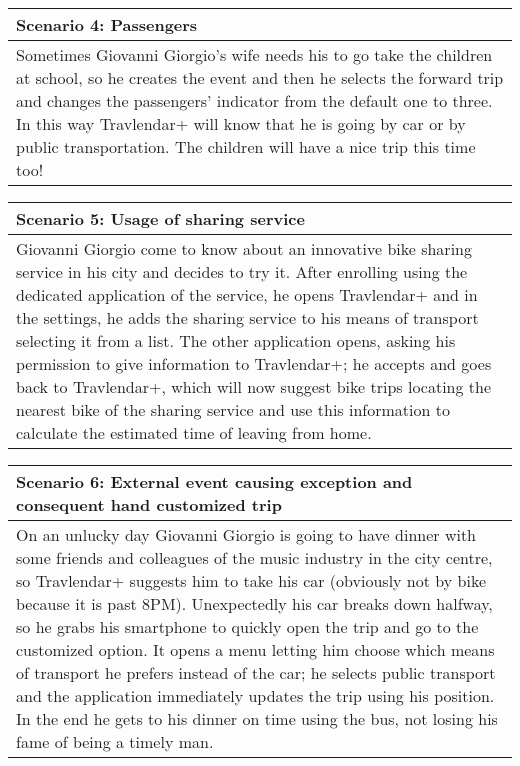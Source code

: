 \pagebreak
%
\begin{center}
\def\arraystretch{1.5}
  \begin{tabular}{ | p{} | }
    \hline
    Scenario 4: Passengers \\ \hline
    Sometimes Giovanni Giorgio's wife needs his to go take the children at school, so he creates the event and then he selects the forward trip and changes the passengers’ indicator from the default one to three. In this way Travlendar+ will know that he is going by car or by public transportation. The children will have a nice trip this time too! \\ \hline
  \end{tabular}
\end{center}
%
\begin{center}
\def\arraystretch{1.5}
  \begin{tabular}{ | p{} | }
    \hline
    Scenario 5: Usage of sharing service \\ \hline
    Giovanni Giorgio come to know about an innovative bike sharing service in his city and decides to try it. After enrolling using the dedicated application of the service, he opens Travlendar+ and in the settings, he adds the sharing service to his means of transport selecting it from a list. The other application opens, asking his permission to give information to Travlendar+; he accepts and goes back to Travlendar+, which will now suggest bike trips locating the nearest bike of the sharing service and use this information to calculate the estimated time of leaving from home. \\ \hline
  \end{tabular}
\end{center}
%
\begin{center}
\def\arraystretch{1.5}
  \begin{tabular}{ | p{} | }
    \hline
    Scenario 6: External event causing exception and consequent hand customized trip \\ \hline
    On an unlucky day Giovanni Giorgio is going to have dinner with some friends and colleagues of the music industry in the city centre, so Travlendar+ suggests him to take his car (obviously not by bike because it is past 8PM). Unexpectedly his car breaks down halfway, so he grabs his smartphone to quickly open the trip and go to the customized option. It opens a menu letting him choose which means of transport he prefers instead of the car; he selects public transport and the application immediately updates the trip using his position. In the end he gets to his dinner on time using the bus, not losing his fame of being a timely man.  \\ \hline
  \end{tabular}
\end{center}
